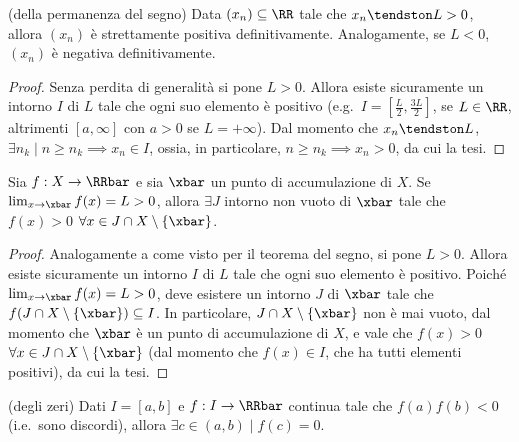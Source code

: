 \documentclass[11pt]{article}
\begin{document}
	\begin{theorem} (della permanenza del segno)
		Data $(x_n) \subseteq \RR$ tale che $x_n \tendston L > 0$, allora
		$(x_n)$ è strettamente positiva definitivamente. Analogamente, se $L < 0$,
		$(x_n)$ è negativa definitivamente.
	\end{theorem}

	\begin{proof}
		Senza perdita di generalità si pone $L > 0$. Allora esiste sicuramente un intorno $I$ di $L$ tale che ogni suo elemento è positivo (e.g.~$I = [\frac{L}{2}, \frac{3L}{2}]$, se $L \in \RR$, altrimenti $[a, \infty]$ con $a > 0$ se $L = +\infty$). Dal momento che $x_n \tendston L$, $\exists n_k \mid n \geq n_k \implies x_n \in I$,
		ossia, in particolare, $n \geq n_k \implies x_n > 0$, da cui la tesi.
	\end{proof}

	\begin{proposition}
		Sia $f : X \to \RRbar$ e sia $\xbar$ un punto di accumulazione di $X$. Se $\lim_{x \to \xbar} f(x) = L > 0$,
		allora $\exists J$ intorno non vuoto di $\xbar$ tale che $f(x) > 0$ $\forall x \in J \cap X \setminus \{\xbar\}$.
	\end{proposition}

	\begin{proof}
		Analogamente a come visto per il teorema del segno, si pone $L > 0$. Allora esiste sicuramente un intorno $I$ di $L$ tale che ogni suo elemento è positivo. Poiché $\lim_{x \to \xbar} f(x) = L > 0$, deve esistere un intorno $J$ di
		$\xbar$ tale che $f(J \cap X \setminus \{\xbar\}) \subseteq I$. In particolare, $J \cap X \setminus \{\xbar\}$ non
		è mai vuoto, dal momento che $\xbar$ è un punto di accumulazione di $X$, e vale che $f(x) > 0$ $\forall x \in J \cap X \setminus \{\xbar\}$ (dal momento che $f(x) \in I$, che ha tutti elementi positivi), da cui la tesi.
	\end{proof}
	
	\begin{theorem} (degli zeri) Dati $I = [a, b]$ e
		$f : I \to \RRbar$ continua tale che $f(a) f(b) < 0$ (i.e.~sono discordi), allora $\exists c \in (a, b) \mid f(c) = 0$.
	\end{theorem}
\end{document}
